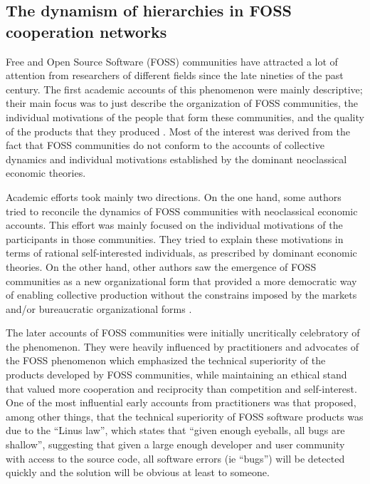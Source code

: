 \subsection{The dynamism of hierarchies in FOSS cooperation networks}

Free and Open Source Software (FOSS) communities have attracted a lot of attention from researchers of different fields since the late nineties of the past century. The first academic accounts of this phenomenon were mainly descriptive; their main focus was to just describe the organization of FOSS communities, the individual motivations of the people that form these communities, and the quality of the products that they produced \citep{benkler:2014}. Most of the interest was derived from the fact that FOSS communities do not conform to the accounts of collective dynamics and individual motivations established by the dominant neoclassical economic theories.

Academic efforts took mainly two directions. On the one hand, some authors tried to reconcile the dynamics of FOSS communities with neoclassical economic accounts. This effort was mainly focused on the individual motivations of the participants in those communities. They tried to explain these motivations in terms of rational self-interested individuals, as prescribed by dominant economic theories. On the other hand, other authors saw the emergence of FOSS communities as a new organizational form that provided a more democratic way of enabling collective production without the constrains imposed by the markets and/or bureaucratic organizational forms \citep{benkler:2002, benkler:2006, castells:2013}.

The later accounts of FOSS communities were initially uncritically celebratory of the phenomenon. They were heavily influenced by practitioners and advocates of the FOSS phenomenon which emphasized the technical superiority of the products developed by FOSS communities, while maintaining an ethical stand that valued more cooperation and reciprocity than competition and self-interest. One of the most influential early accounts from practitioners was \citet{raymond:1999} that proposed, among other things, that the technical superiority of FOSS software products was due to the ``Linus law'', which states that ``given enough eyeballs, all bugs are shallow'', suggesting that given a large enough developer and user community with access to the source code, all software errors (ie ``bugs'') will be detected quickly and the solution will be obvious at least to someone.

